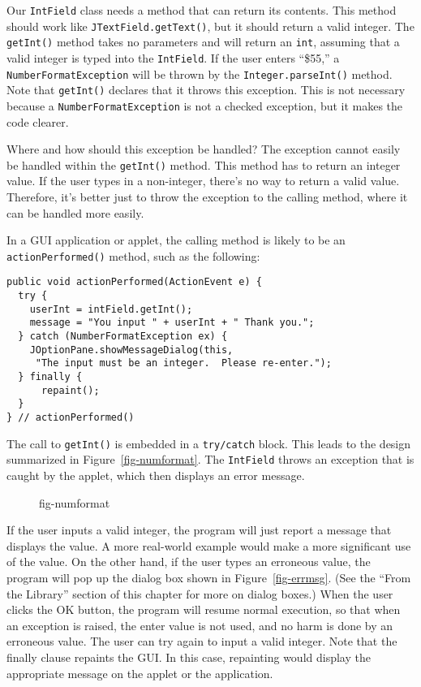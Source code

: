 Our {\tt IntField} class needs a method that can return its
contents.  This method should work like {\tt JTextField.getText()}, but
it should return a valid integer.  The {\tt getInt()} method takes no
parameters and will return an {\tt int}, assuming that a valid integer
is typed into the {\tt IntField}.  If the user enters ``\$55,'' a
{\tt NumberFormatException} will be thrown by the {\tt Integer.parseInt()}
method.  Note that {\tt getInt()} declares that it throws this
exception.  This is not necessary because a {\tt NumberFormatException}
is not a checked exception, but it makes the code clearer.

Where and how should this exception be handled? The exception cannot
easily be handled within the {\tt getInt()} method.  This method has to
return an integer value.  If the user types in a non-integer, there's
no way to return a valid value.  Therefore, it's better just to throw
the exception to the calling method, where it can be handled more
easily.


In a GUI application or applet, the calling method is likely to be
an {\tt actionPerformed()} method, such as the following:

\begin{jjjlisting}
\begin{lstlisting}
public void actionPerformed(ActionEvent e) {
  try {
    userInt = intField.getInt();
    message = "You input " + userInt + " Thank you.";
  } catch (NumberFormatException ex) {
    JOptionPane.showMessageDialog(this,
     "The input must be an integer.  Please re-enter.");
  } finally {
      repaint();
  }
} // actionPerformed()
\end{lstlisting}
\end{jjjlisting}

\noindent The call to {\tt getInt()} is embedded in a {\tt try/catch}
block.  This leads to the design summarized in 
Figure~\ref{fig-numformat}.  The {\tt IntField} throws an exception that
is caught by the applet, which then displays an error message.

\begin{figure}[h]
{fig-numformat}

\end{figure}

If the user inputs a valid integer, the program will just report a
message that displays the value.  A more real-world example would make
a more significant use of the value.  On the other hand, if the user
types an erroneous value, the program will pop up the dialog box shown
in Figure~\ref{fig-errmsg}. (See the ``From the Library'' section of
this chapter for more on dialog boxes.) When the user clicks the OK
button, the program will resume normal execution, so that when an
exception is raised, the enter value is not used, and no harm is done
by an erroneous value.  The user can try again to input a valid
integer.  Note that the finally clause repaints the GUI.  In this
case, repainting would display the appropriate message on the applet
or the application.

